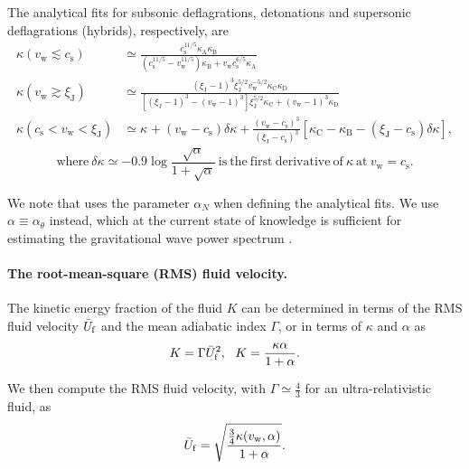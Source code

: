 \documentclass[10pt]{article}
\begin{document}
The analytical fits for subsonic deflagrations, detonations and supersonic deflagrations (hybrids), respectively, are
\begin{align}
    \kappa(v_\mathrm{w} \lesssim c_\mathrm{s}) &\simeq \frac{c_\mathrm{s}^{11/5} \kappa_\mathrm{A}\kappa_\mathrm{B}}{(c_\mathrm{s}^{11/5}-v_\mathrm{w}^{11/5})\kappa_\mathrm{B} + v_\mathrm{w} c_\mathrm{s}^{6/5} \kappa_\mathrm{A}} \\
    \kappa(v_\mathrm{w} \gtrsim \xi_\mathrm{J}) &\simeq \frac{(\xi_\mathrm{J}-1)^3 \xi_\mathrm{J}^{5/2} v_\mathrm{w}^{-5/2} \kappa_\mathrm{C}\kappa_\mathrm{D}}{[(\xi_\mathrm{J}-1)^3-(v_\mathrm{w}-1)^3] \xi_\mathrm{J}^{5/2} \kappa_\mathrm{C} + (v_\mathrm{w}-1)^3 \kappa_\mathrm{D}} \\
    \kappa(c_\mathrm{s}<v_\mathrm{w}<\xi_\mathrm{J}) &\simeq \kappa_\mathrm{} + (v_\mathrm{w}-c_\mathrm{s})\delta\kappa + \frac{(v_\mathrm{w}-c_\mathrm{s})^3}{(\xi_\mathrm{J}-c_\mathrm{s})^3}[\kappa_\mathrm{C}-\kappa_\mathrm{B}-(\xi_\mathrm{J}-c_\mathrm{s})\delta\kappa],
\end{align}
\begin{equation}
    \mathrm{where} \ \delta\kappa \simeq -0.9\log{\frac{\sqrt{\alpha}}{1+\sqrt{\alpha}}} \ \mathrm{is \ the \ first \ derivative \ of} \ \kappa \ \mathrm{at} \ v_\mathrm{w}=c_\mathrm{s}.
\end{equation}

We note that \cite{espinosa10} uses the parameter $\alpha_N$ when defining the analytical fits. We use $\alpha\equiv\alpha_\theta$ instead, which at the current state of knowledge is sufficient for estimating the gravitational wave power spectrum \cite{lisa19}.

\paragraph{The root-mean-square (RMS) fluid velocity.}
The kinetic energy fraction of the fluid $K$ can be determined in terms of the RMS fluid velocity $\Bar{U}_\mathrm{f}$ and the mean adiabatic index $\Gamma$, or in terms of $\kappa$ and $\alpha$ \cite{lisa19} as
\begin{equation}
    K = \Gamma \Bar{U}_\mathrm{f}^2, \ \ K = \frac{\kappa\alpha}{1+\alpha}.
\end{equation}

We then compute the RMS fluid velocity, with $\Gamma\simeq\frac{4}{3}$ for an ultra-relativistic fluid, as
\begin{equation}
    \Bar{U}_\mathrm{f} = \sqrt{\frac{\frac{3}{4}\kappa(v_\mathrm{w},\alpha)}{1+\alpha}}.
\end{equation}
\end{document}
